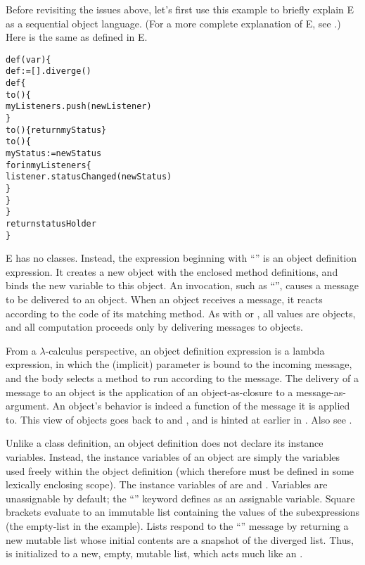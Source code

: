 \documentclass{llncs}
\begin{document}
Before revisiting the issues above, let's first use this example to
briefly explain E as a sequential object language. (For a more
complete explanation of E, see \cite{stiegler:ewalnut}.)  Here is the
same  as defined in E.
%
\begin{alltt}
    def (var ) \{
        def  := [].diverge()
        def  \{
            to () \{
                myListeners.push(newListener)
            \}
            to () \{ return myStatus \}
            to () \{
                myStatus := newStatus
                for  in myListeners \{
                    listener.statusChanged(newStatus)
                \}
            \}
        \}
        return statusHolder
    \}
\end{alltt}
%
E has no classes. Instead, the expression beginning with ``'' is an object definition expression. It creates
a new object with the enclosed method definitions, and binds the new
 variable to this object. An invocation, such as
``'', causes a message to be
delivered to an object. When an object receives a message, it reacts
according to the code of its matching method. As with 
\cite{goldberg:purplebook} or  \cite{hewitt:actors}, all
values are objects, and all computation proceeds only by delivering
messages to objects.

 From a $\lambda$-calculus perspective, an object definition
expression is a lambda expression, in which the (implicit) parameter
is bound to the incoming message, and the body selects a method to run
according to the message. The delivery of a message to an object is
the application of an object-as-closure to a message-as-argument. An
object's behavior is indeed a function of the message it is applied
to. This view of objects goes back to 
\cite{goldberg:smalltalk72} and , and is hinted at earlier
in \cite{hoare65}. Also see \cite{shroff:match}.

Unlike a class definition, an object definition does not declare its
instance variables. Instead, the instance variables of an object are
simply the variables used freely within the object definition (which
therefore must be defined in some lexically enclosing scope). The
instance variables of  are  and
.  Variables are unassignable by default; the
``'' keyword defines  as an assignable
variable. Square brackets evaluate to an immutable list containing the
values of the subexpressions (the empty-list in the example). Lists
respond to the ``'' message by returning a new mutable
list whose initial contents are a snapshot of the diverged list. Thus,
 is initialized to a new, empty, mutable list, which
acts much like an .
\end{document}
